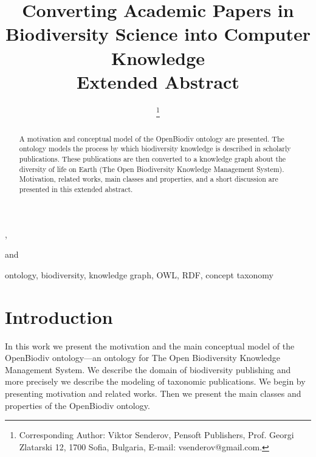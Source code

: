 \documentclass{IOS-Book-Article}
\def\hb{\hbox to 10.7 cm{}}
\begin{document}
\def\thepage{}

\begin{frontmatter}              %


\title{Converting Academic Papers in Biodiversity Science into Computer Knowledge\\\textbf{ {\normalsize Extended Abstract}}}


\author[A,B]{ %
\thanks{Corresponding Author: Viktor Senderov, Pensoft Publishers, Prof. Georgi Zlatarski 12, 1700 Sofia, Bulgaria, E-mail: vsenderov@gmail.com.}},
\author[B]{ }
and 
\author[A,B]{ } 

\address[A]{Pensoft Publishers, Sofia, Bulgaria}
\address[B]{Bulgarian Academy of Sciences, Sofia, Bulgaria}

\begin{abstract}
A motivation and conceptual model of the OpenBiodiv ontology are presented. The ontology models the process by which biodiversity knowledge is described in scholarly publications. These publications are then converted to a knowledge graph about the diversity of life on Earth (The {Open} {Biodiversity} {Knowledge} {Management} {System}). Motivation, related works, main classes and properties, and a short discussion are presented in this extended abstract.
\end{abstract}

\begin{keyword}
ontology, biodiversity, knowledge graph, OWL, RDF, concept taxonomy
\end{keyword}
\end{frontmatter}
\markboth{July 2017\hb}{July 2017\hb}

\section{Introduction}

In this work we present the motivation and the main conceptual model of the OpenBiodiv ontology---an ontology for The {Open} {Biodiversity} {Knowledge} {Management} {System}. We describe the domain of biodiversity publishing and more precisely we describe the modeling of taxonomic publications. We begin by presenting motivation and related works. Then we present the main classes and properties of the OpenBiodiv ontology.
\end{document}
